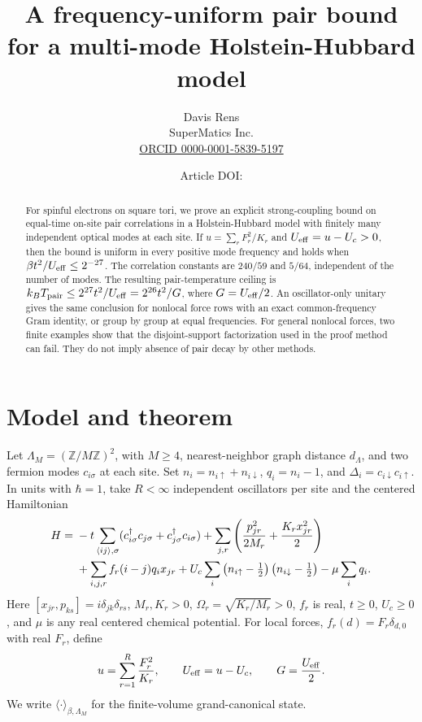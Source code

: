 \documentclass[11pt]{article}
\title{A frequency-uniform pair bound for a multi-mode Holstein-Hubbard model}
\author{Davis Rens\\SuperMatics Inc.\\\href{https://orcid.org/0000-0001-5839-5197}{ORCID 0000-0001-5839-5197}}
\date{\scriptsize Article DOI: \DOI{10.5281/zenodo.24384461}}
\newcommand{\Deltaop}{\Delta}
\begin{document}
\maketitle

\begin{abstract}
For spinful electrons on square tori, we prove an explicit strong-coupling bound on equal-time on-site pair correlations in a Holstein-Hubbard model with finitely many independent optical modes at each site. If $u=\sum_r F_r^2/K_r$ and $U_{\rm eff}=u-U_c>0$, then the bound is uniform in every positive mode frequency and holds when $\beta t^2/U_{\rm eff}\le 2^{-27}$. The correlation constants are $240/59$ and $5/64$, independent of the number of modes. The resulting pair-temperature ceiling is $k_B T_{\rm pair}\le 2^{27}t^2/U_{\rm eff}=2^{26}t^2/G$, where $G=U_{\rm eff}/2$. An oscillator-only unitary gives the same conclusion for nonlocal force rows with an exact common-frequency Gram identity, or group by group at equal frequencies. For general nonlocal forces, two finite examples show that the disjoint-support factorization used in the proof method can fail. They do not imply absence of pair decay by other methods.
\end{abstract}

\section{Model and theorem}
Let $\Lambda_M=(\mathbb Z/M\mathbb Z)^2$, with $M\ge4$, nearest-neighbor graph distance $d_\Lambda$, and two fermion modes $c_{i\sigma}$ at each site. Set $n_i=n_{i\uparrow}+n_{i\downarrow}$, $q_i=n_i-1$, and $\Deltaop_i=c_{i\downarrow}c_{i\uparrow}$. In units with $\hbar=1$, take $R<\infty$ independent oscillators per site and the centered Hamiltonian
\begin{align}
H={}&-t\sum_{\langle ij\rangle,\sigma}
(c_{i\sigma}^\dagger c_{j\sigma}+c_{j\sigma}^\dagger c_{i\sigma})
+\sum_{j,r}\left(\frac{p_{jr}^2}{2M_r}+\frac{K_r x_{jr}^2}{2}\right)\notag\\
&+\sum_{i,j,r}f_r(i-j)q_i x_{jr}
+U_c\sum_i\left(n_{i\uparrow}-\tfrac12\right)
\left(n_{i\downarrow}-\tfrac12\right)-\mu\sum_iq_i .
\label{eq:model}
\end{align}
Here $[x_{jr},p_{ks}]=i\delta_{jk}\delta_{rs}$, $M_r,K_r>0$, $\Omega_r=\sqrt{K_r/M_r}>0$, $f_r$ is real, $t\ge0$, $U_c\ge0$, and $\mu$ is any real centered chemical potential. For local forces, $f_r(d)=F_r\delta_{d,0}$ with real $F_r$, define
\[
 u=\sum_{r=1}^R\frac{F_r^2}{K_r},\qquad U_{\rm eff}=u-U_c,\qquad G=\frac{U_{\rm eff}}2.
\]
We write $\langle\cdot\rangle_{\beta,\Lambda_M}$ for the finite-volume grand-canonical state.
\end{document}
